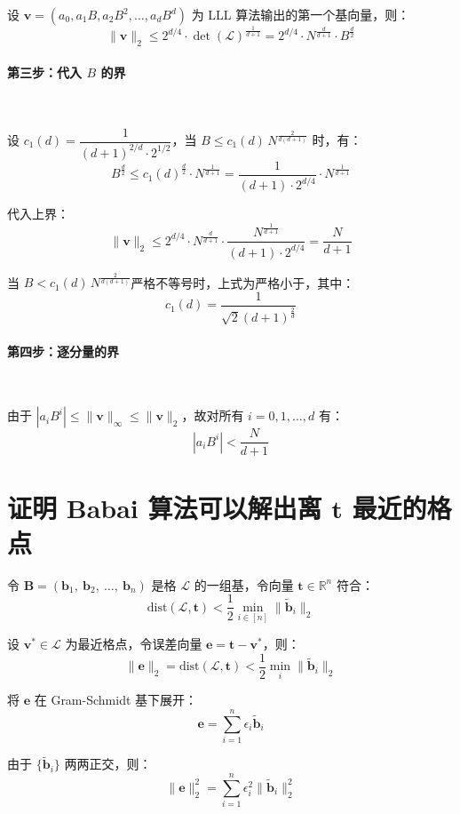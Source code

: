 \documentclass{article}
\begin{document}
设 $\bm{v} = (a_0, a_1 B, a_2 B^2, \ldots, a_d B^d)$ 为 LLL 算法输出的第一个基向量，则：
\[ \|\bm{v}\|_2 \leqslant 2^{d/4} \cdot \det(\mathcal{L})^{\tfrac{1}{d+1}} = 2^{d/4} \cdot N^{\tfrac{d}{d+1}} \cdot B^{\tfrac{d}{2}} \]



\paragraph*{第三步：代入 $B$ 的界}~{}

设 $c_1(d) = \dfrac{1}{(d+1)^{2/d} \cdot 2^{1/2}}$，当 $B \leqslant c_1(d)\, N^{\tfrac{2}{d(d+1)}}$ 时，有：
\[ B^{\tfrac{d}{2}} \leqslant c_1(d)^{\tfrac{d}{2}} \cdot N^{\tfrac{1}{d+1}}= \dfrac{1}{(d+1)\cdot 2^{d/4}} \cdot N^{\tfrac{1}{d+1}} \]

代入上界：
\[ \|\bm{v}\|_2 \leqslant 2^{d/4} \cdot N^{\tfrac{d}{d+1}} \cdot \dfrac{N^{\tfrac{1}{d+1}}}{(d+1)\cdot 2^{d/4}} = \dfrac{N}{d+1} \]

当 $B < c_1(d)\, N^{\tfrac{2}{d(d+1)}}$严格不等号时，上式为严格小于，其中：
\[ c_1(d)=\dfrac{1}{\sqrt{2}(d+1)^{\tfrac{2}{d}}} \]



\paragraph*{第四步：逐分量的界}~{}

由于 $\left|a_iB^i\right| \leqslant \|\bm{v}\|_\infty \leqslant \|\bm{v}\|_2$，故对所有 $i = 0, 1, \ldots, d$ 有：
\[ \left|a_iB^i\right|<\dfrac{N}{d+1} \]



\section{证明 Babai 算法可以解出离 $\bm{t}$ 最近的格点}
令 $\bm{B}=(\bm{b}_1,\ \bm{b}_2,\ \ldots,\ \bm{b}_n)$ 是格 $\mathcal{L}$ 的一组基，令向量 $\bm{t}\in\mathbb{R}^n$ 符合：
\[ \text{dist}(\mathcal{L},\bm{t})<\dfrac{1}{2}\min\limits_{i\in[n]}\|\tilde{\bm{b}}_i\|_2 \]

设 $\bm{v}^* \in \mathcal{L}$ 为最近格点，令误差向量 $\bm{e} = \bm{t} - \bm{v}^*$，则：
\[ \|\bm{e}\|_2 = \text{dist}(\mathcal{L},\bm{t})<\dfrac{1}{2}\min\limits_{i}\|\tilde{\bm{b}}_i\|_2 \]

将 $\bm{e}$ 在 Gram-Schmidt 基下展开：
\[ \bm{e}=\sum_{i=1}^n \epsilon_i \tilde{\bm{b}}_i \]

由于 $\{\tilde{\bm{b}}_i\}$ 两两正交，则：
\[ \|\bm{e}\|_2^2 = \sum_{i=1}^n \epsilon_i^2 \|\tilde{\bm{b}}_i\|_2^2 \]
\end{document}
